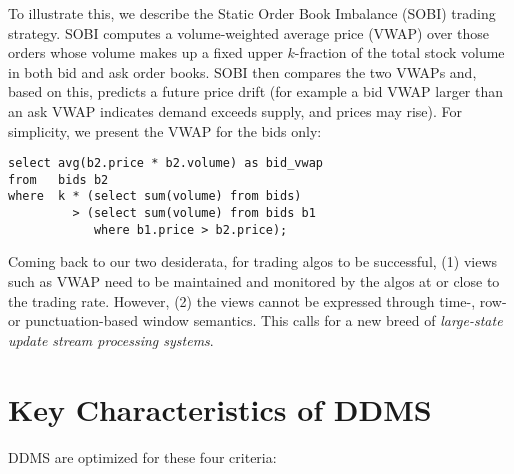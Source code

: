To illustrate this, we describe the Static Order Book Imbalance (SOBI) trading
strategy. SOBI computes a volume-weighted average price (VWAP) over those orders
whose volume makes up a fixed upper $k$-fraction of the total stock volume in
both bid and ask order books. SOBI then compares the two VWAPs and, based on
this, predicts a future price drift (for example a bid VWAP larger than an ask
VWAP indicates demand exceeds supply, and prices may rise). For simplicity, we
present the VWAP for the bids only:



\begin{verbatim}
select avg(b2.price * b2.volume) as bid_vwap
from   bids b2
where  k * (select sum(volume) from bids)
         > (select sum(volume) from bids b1
            where b1.price > b2.price);
\end{verbatim}


Coming back to our two desiderata, for trading algos to be successful, (1) views
such as VWAP need to be maintained and monitored by the algos at or close to the
trading rate. However, (2) the views cannot be expressed through time-, row- or
punctuation-based window semantics. This calls for a new breed of {\em
large-state update stream processing systems}.





\section{Key Characteristics of DDMS}


\noindent DDMS are optimized for these four criteria:


